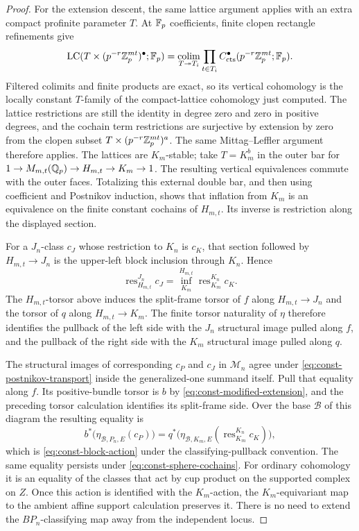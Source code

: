 \begin{proof}
For the extension descent, the same lattice argument applies with an
extra compact profinite parameter $T$.  At $\mathbb F_p$ coefficients, finite
clopen rectangle refinements give
\[
 \operatorname{LC}(T\times(p^{-r}\mathbb Z_p^{mt})^\bullet;\mathbb F_p)
  =\operatorname*{colim}_{T\twoheadrightarrow T_i}
       \prod_{t\in T_i}C^\bullet_{\mathrm{cts}}(p^{-r}\mathbb Z_p^{mt};\mathbb F_p).
\]
Filtered colimits and finite products are exact, so its vertical
cohomology is the locally constant $T$-family of the compact-lattice
cohomology just computed.  The lattice restrictions are still the
identity in degree zero and zero in positive degrees, and the cochain
term restrictions are surjective by extension by zero from the clopen
subset $T\times(p^{-r}\mathbb Z_p^{mt})^a$.  The same Mittag--Leffler argument
therefore applies.  The lattices are $K_m$-stable; take $T=K_m^b$ in
the outer bar for
$1\to M_{m,t}(\mathbb Q_p)\to H_{m,t}\to K_m\to1$.  The resulting vertical
equivalences commute with the outer faces.  Totalizing this external
double bar, and then using coefficient and Postnikov induction, shows
that inflation from $K_m$ is an equivalence on the finite constant
cochains of $H_{m,t}$.  Its inverse is restriction along the displayed
section.

For a $J_n$-class $c_J$ whose restriction to $K_n$ is $c_K$, that
section followed by $H_{m,t}\to J_n$ is the upper-left block inclusion
through $K_n$.  Hence
\[
 \operatorname{res}^{J_n}_{H_{m,t}}c_J
   =\operatorname{inf}^{H_{m,t}}_{K_m}
       \operatorname{res}^{K_n}_{K_m}c_K.
\]
The $H_{m,t}$-torsor above induces the split-frame torsor of $f$ along
$H_{m,t}\to J_n$ and the torsor of $q$ along $H_{m,t}\to K_m$.
The finite torsor naturality of $\eta$ therefore identifies the pullback
of the left side with the $J_n$ structural image pulled along $f$, and
the pullback of the right side with the $K_m$ structural image pulled
along $q$.

The structural images of corresponding $c_P$ and $c_J$ in
$\mathcal M_n$ agree under
\eqref{eq:const-postnikov-transport} inside the generalized-one
summand itself.  Pull that equality along $f$.  Its positive-bundle
torsor is $b$ by \eqref{eq:const-modified-extension}, and the preceding
torsor calculation identifies its split-frame side.  Over the base
$\mathcal B$ of this diagram the resulting equality is
\[
 b^*\bigl(\eta_{\mathcal B,P_n,E}(c_P)\bigr)
   =q^*\bigl(\eta_{\mathcal B,K_m,E}
       (\operatorname{res}^{K_n}_{K_m}c_K)\bigr),
\]
which is \eqref{eq:const-block-action} under the classifying-pullback
convention.  The same equality persists under
\eqref{eq:const-sphere-cochains}.  For ordinary cohomology it is an
equality of the classes that act by cup product on the supported
complex on $Z$.  Once this action is identified with the $K_m$-action,
the $K_m$-equivariant map to the ambient affine support calculation
preserves it.  There is no need to extend the $BP_n$-classifying map
away from the independent locus.
\end{proof}
